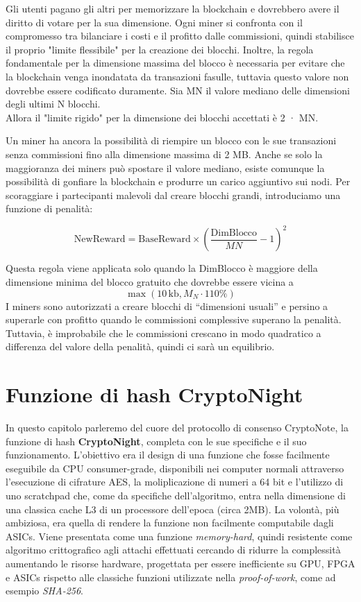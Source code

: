 \documentclass[
]{article}
\begin{document}
Gli utenti pagano gli altri per memorizzare la blockchain e dovrebbero
avere il diritto di votare per la sua dimensione. Ogni miner si
confronta con il compromesso tra bilanciare i costi e il profitto dalle
commissioni, quindi stabilisce il proprio "limite flessibile" per la
creazione dei blocchi. Inoltre, la regola fondamentale per la dimensione
massima del blocco è necessaria per evitare che la blockchain venga
inondatata da transazioni fasulle, tuttavia questo valore non dovrebbe
essere codificato duramente. Sia MN il valore mediano delle dimensioni
degli ultimi N blocchi.\\
Allora il "limite rigido" per la dimensione dei blocchi accettati è 2 ·
MN.

Un miner ha ancora la possibilità di riempire un blocco con le sue
transazioni senza commissioni fino alla dimensione massima di 2 MB.
Anche se solo la maggioranza dei miners può spostare il valore mediano,
esiste comunque la possibilità di gonfiare la blockchain e produrre un
carico aggiuntivo sui nodi. Per scoraggiare i partecipanti malevoli dal
creare blocchi grandi, introduciamo una funzione di penalità:

\[
\text{NewReward} = \text{BaseReward} \times \left( \frac{\text{DimBlocco}}{MN} - 1 \right)^2
\]

Questa regola viene applicata solo quando la DimBlocco è maggiore della
dimensione minima del blocco gratuito che dovrebbe essere vicina a \[
\max(10\, \text{kb}, M_N \cdot 110\%) \] I miners sono autorizzati a
creare blocchi di ``dimensioni usuali'' e persino a superarle con
profitto quando le commissioni complessive superano la penalità.\\
Tuttavia, è improbabile che le commissioni crescano in modo quadratico a
differenza del valore della penalità, quindi ci sarà un equilibrio.

\section{Funzione di hash
CryptoNight}\label{funzione-di-hash-cryptonight}

In questo capitolo parleremo del cuore del protocollo di consenso
CryptoNote, la funzione di hash \textbf{CryptoNight}, completa con le
sue specifiche e il suo funzionamento. L'obiettivo era il design di una
funzione che fosse facilmente eseguibile da CPU consumer-grade,
disponibili nei computer normali attraverso l'esecuzione di cifrature
AES, la moliplicazione di numeri a 64 bit e l'utilizzo di uno scratchpad
che, come da specifiche dell'algoritmo, entra nella dimensione di una
classica cache L3 di un processore dell'epoca (circa 2MB). La volontà,
più ambiziosa, era quella di rendere la funzione non facilmente
computabile dagli ASICs. Viene presentata come una funzione
\emph{memory-hard}, quindi resistente come algoritmo crittografico agli
attachi effettuati cercando di ridurre la complessità aumentando le
risorse hardware, progettata per essere inefficiente su GPU, FPGA e
ASICs rispetto alle classiche funzioni utilizzate nella
\emph{proof-of-work}, come ad esempio \emph{SHA-256}.
\end{document}
